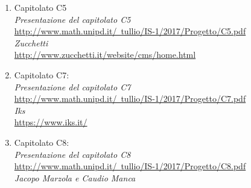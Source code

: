 \documentclass[main.tex]{subfiles}
\begin{document}
\begin{enumerate}
	\item Capitolato C5\\
		\textit{Presentazione del capitolato C5}\\
		\href{http://www.math.unipd.it/~tullio/IS-1/2017/Progetto/C5.pdf}{http://www.math.unipd.it/~tullio/IS-1/2017/Progetto/C5.pdf}\\
		\textit{Zucchetti}\\
		\href{http://www.zucchetti.it/website/cms/home.html}{http://www.zucchetti.it/website/cms/home.html}\\
		
	\item Capitolato C7:\\
		\textit{Presentazione del capitolato C7}\\
		\href{http://www.math.unipd.it/~tullio/IS-1/2017/Progetto/C7.pdf}{http://www.math.unipd.it/~tullio/IS-1/2017/Progetto/C7.pdf}\\
		\textit{Iks}\\
		\href{https://www.iks.it/}{https://www.iks.it/}\\
		
	\item Capitolato C8:\\
		\textit{Presentazione del capitolato C8}\\
		\href{http://www.math.unipd.it/~tullio/IS-1/2017/Progetto/C8.pdf}{http://www.math.unipd.it/~tullio/IS-1/2017/Progetto/C8.pdf}\\
		\textit{Jacopo Marzola e Caudio Manca}\\
		
		
\end{enumerate}
	
\end{document}
